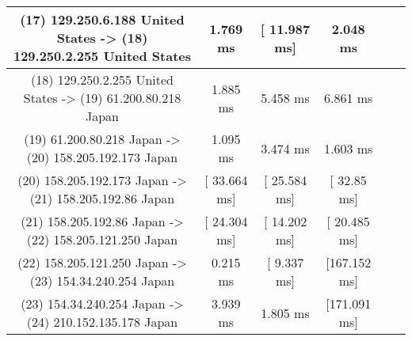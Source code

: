 \begin{table}[]
\begin{tabular}{ | c | c | c | c | c | c | }
(17) 129.250.6.188   United States   -> (18) 129.250.2.255   United States&  	     1.769 ms   &	  [ 11.987 ms]  	 &    2.048 ms    \\ \hline
(18) 129.250.2.255   United States   -> (19) 61.200.80.218   Japan        &  	     1.885 ms   &	     5.458 ms   	 &    6.861 ms    \\ \hline
(19) 61.200.80.218   Japan           -> (20) 158.205.192.173 Japan        &  	     1.095 ms   &	     3.474 ms   	 &    1.603 ms    \\ \hline
(20) 158.205.192.173 Japan           -> (21) 158.205.192.86  Japan        &  	  [ 33.664 ms]  &	  [ 25.584 ms]  	 & [  32.85 ms]   \\ \hline
(21) 158.205.192.86  Japan           -> (22) 158.205.121.250 Japan        &  	  [ 24.304 ms]  &	  [ 14.202 ms]  	 & [ 20.485 ms]   \\ \hline
(22) 158.205.121.250 Japan           -> (23) 154.34.240.254  Japan        &  	     0.215 ms   &	  [  9.337 ms]  	 & [167.152 ms]   \\ \hline
(23) 154.34.240.254  Japan           -> (24) 210.152.135.178 Japan        &  	     3.939 ms   &	     1.805 ms   	 & [171.091 ms]   \\ \hline
\end{tabular}
\end{table}
